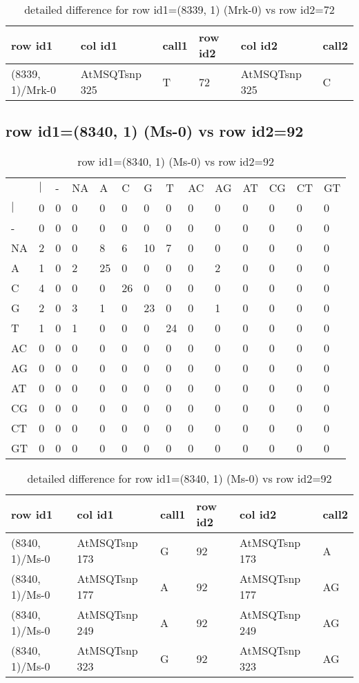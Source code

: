 \begin{center}
\begin{longtable}{|l|l|l|l|l|l|}
\caption{detailed difference for row id1=(8339, 1) (Mrk-0) vs row id2=72} \label{table_dm545}\\
\hline
row id1&col id1&call1&row id2&col id2&call2\\
\hline
(8339, 1)/Mrk-0&AtMSQTsnp 325&T&72&AtMSQTsnp 325&C\\
\hline
\end{longtable}
\end{center}

\subsection{row id1=(8340, 1) (Ms-0) vs row id2=92}
\begin{center}
\begin{longtable}{|l|l|l|l|l|l|l|l|l|l|l|l|l|l|}
\caption{row id1=(8340, 1) (Ms-0) vs row id2=92} \label{table_dm546}\\
\hline
\\
\hline
&$|$&-&NA&A&C&G&T&AC&AG&AT&CG&CT&GT\\
$|$&0&0&0&0&0&0&0&0&0&0&0&0&0\\
-&0&0&0&0&0&0&0&0&0&0&0&0&0\\
NA&2&0&0&8&6&10&7&0&0&0&0&0&0\\
A&1&0&2&25&0&0&0&0&2&0&0&0&0\\
C&4&0&0&0&26&0&0&0&0&0&0&0&0\\
G&2&0&3&1&0&23&0&0&1&0&0&0&0\\
T&1&0&1&0&0&0&24&0&0&0&0&0&0\\
AC&0&0&0&0&0&0&0&0&0&0&0&0&0\\
AG&0&0&0&0&0&0&0&0&0&0&0&0&0\\
AT&0&0&0&0&0&0&0&0&0&0&0&0&0\\
CG&0&0&0&0&0&0&0&0&0&0&0&0&0\\
CT&0&0&0&0&0&0&0&0&0&0&0&0&0\\
GT&0&0&0&0&0&0&0&0&0&0&0&0&0\\
\hline
\end{longtable}
\end{center}

\begin{center}
\begin{longtable}{|l|l|l|l|l|l|}
\caption{detailed difference for row id1=(8340, 1) (Ms-0) vs row id2=92} \label{table_dm547}\\
\hline
row id1&col id1&call1&row id2&col id2&call2\\
\hline
(8340, 1)/Ms-0&AtMSQTsnp 173&G&92&AtMSQTsnp 173&A\\
(8340, 1)/Ms-0&AtMSQTsnp 177&A&92&AtMSQTsnp 177&AG\\
(8340, 1)/Ms-0&AtMSQTsnp 249&A&92&AtMSQTsnp 249&AG\\
(8340, 1)/Ms-0&AtMSQTsnp 323&G&92&AtMSQTsnp 323&AG\\
\hline
\end{longtable}
\end{center}

